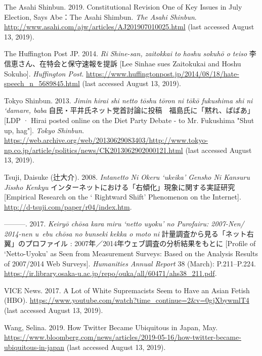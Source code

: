 \documentclass[10pt,british,A4paper,twoside]{memoir}
\begin{document}
\hypertarget{ref-the_asahi_shimbun_constitutional_2019}{}
The Asahi Shinbun. 2019. Constitutional Revision One of Key Issues in
July Election, Says Abe：The Asahi Shimbun. \emph{The Asahi Shinbun}.
\url{http://www.asahi.com/ajw/articles/AJ201907010025.html} (last accessed August 13, 2019).

\hypertarget{ref-the_huffington_post_jp_lee_2014}{}
The Huffington Post JP. 2014. \emph{Ri Shine-san, zaitokkai to hoshu sokuhō o teiso} 李信恵さん、在特会と保守速報を提訴 [Lee Sinhae sues Zaitokukai and Hoshu Sokuho]. \emph{Huffington Post}.
\url{https://www.huffingtonpost.jp/2014/08/18/hate-speech_n_5689845.html} (last accessed August 13, 2019).


\hypertarget{ref-tokyo_shimbun_tokyo_2013}{}
Tokyo Shinbun. 2013. \emph{Jimin hirai shi netto tōshu tōron ni tōkō fukushima shi ni `damare, baba} 自民・平井氏ネット党首討論に投稿　福島氏に「黙れ、ばばあ」 [LDP · Hirai posted online on the Diet Party Debate - to Mr. Fukushima "Shut up, hag"]. \emph{Tokyo Shinbun}.
\url{https://web.archive.org/web/20130629083403/http://www.tokyo-np.co.jp/article/politics/news/CK2013062902000121.html} (last accessed August 13, 2019).


\hypertarget{ref-tsuji_eng:_2008}{}
Tsuji, Daisuke (辻大介). 2008. \emph{Intanetto Ni Okeru ‘ukeika’ Gensho Ni Kansuru Jissho Kenkyu} インターネットにおける「右傾化」現象に関する実証研究 [Empirical Research on the ` Rightward Shift' Phenomenon on the Internet]. 
\url{http://d-tsuji.com/paper/r04/index.htm}.

\hypertarget{ref-tsuji_eng._2017}{}
---------. 2017. \emph{Keiryō chōsa kara miru `netto uyoku' no Purofairu: 2007-Nen/ 2014-nen u~ebu chōsa no bunseki kekka o moto ni} 計量調査から見る「ネット右翼」のプロファイル : 2007年／2014年ウェブ調査の分析結果をもとに [Profile of `Netto-Uyoku' as Seen from Measurement Surveys: Based on the Analysis Results of 2007/2014 Web Surveys].
\emph{Humanities Annual Report} 38 (March): P.211--P.224.
\url{https://ir.library.osaka-u.ac.jp/repo/ouka/all/60471/ahs38_211.pdf}.

\hypertarget{ref-vice_news_lot_2017}{}
VICE News. 2017. A Lot of White Supremacists Seem to Have an Asian
Fetish (HBO).
\url{https://www.youtube.com/watch?time_continue=2\&v=0gjXbywmlT4} (last accessed August 13, 2019).

\hypertarget{ref-wang_how_2019}{}
Wang, Selina. 2019. How Twitter Became Ubiquitous in Japan, May.
\url{https://www.bloomberg.com/news/articles/2019-05-16/how-twitter-became-ubiquitous-in-japan} (last accessed August 13, 2019).
\end{document}

